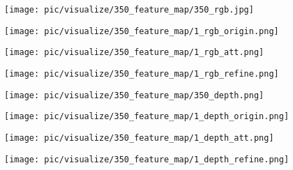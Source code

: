 \documentclass[10pt,twocolumn,letterpaper]{article}
\begin{document}
\begin{figure*}[t]
  \centering
\begin{minipage}[c]{0.115\linewidth}
      \texttt{[image: pic/visualize/350\_feature\_map/350\_rgb.jpg]}
   \end{minipage}
   \begin{minipage}[c]{0.115\linewidth}
      \texttt{[image: pic/visualize/350\_feature\_map/1\_rgb\_origin.png]}
   \end{minipage}
   \begin{minipage}[c]{0.115\linewidth}
      \texttt{[image: pic/visualize/350\_feature\_map/1\_rgb\_att.png]}
   \end{minipage}
   \begin{minipage}[c]{0.115\linewidth}
      \texttt{[image: pic/visualize/350\_feature\_map/1\_rgb\_refine.png]}
   \end{minipage}\hspace{3pt}
      \begin{minipage}[c]{0.115\linewidth}
      \texttt{[image: pic/visualize/350\_feature\_map/350\_depth.png]}
   \end{minipage}
   \begin{minipage}[c]{0.115\linewidth}
      \texttt{[image: pic/visualize/350\_feature\_map/1\_depth\_origin.png]}
   \end{minipage}
   \begin{minipage}[c]{0.115\linewidth}
      \texttt{[image: pic/visualize/350\_feature\_map/1\_depth\_att.png]}
   \end{minipage}
   \begin{minipage}[c]{0.115\linewidth}
      \texttt{[image: pic/visualize/350\_feature\_map/1\_depth\_refine.png]}
   \end{minipage}
   

\end{figure*}
\end{document}
